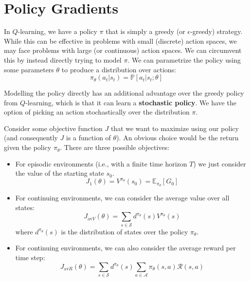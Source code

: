 \documentclass[journal, onecolumn, 12pt, draftclsnofoot]{IEEEtran}
\newcommand{\kword}[1]{\textbf{#1}}
\newcommand{\mc}[1]{\mathcal{#1}}
\begin{document}
		\newpage
		\section{Policy Gradients}
		\label{sec:policy-gradients}
		\par In $Q$-learning, we have a policy $\pi$ that is simply a greedy (or $\epsilon$-greedy) strategy. While this can be effective in problems with small (discrete) action spaces, we may face problems with large (or continuous) action spaces. We can circumvent this by instead directly trying to model $\pi$. We can parametrize the policy using some parameters $\theta$ to produce a distribution over actions:
		\begin{equation}
			\label{eqn:policy-as-distribution}
			\pi_\theta(a_t \big\vert s_t) = \mathbb{P}\left[ a_t \big\vert s_t; \theta \right]
		\end{equation}
		\par Modelling the policy directly has an additional advantage over the greedy policy from $Q$-learning, which is that it can learn a \kword{stochastic policy}. We have the option of picking an action stochastically over the distribution $\pi$.
		\par Consider some objective function $J$ that we want to maximize using our policy (and consequently $J$ is a function of $\theta$). An obvious choice would be the return given the policy $\pi_\theta$. There are three possible objectives:
		\begin{itemize}
			\item For episodic environments (i.e., with a finite time horizon $T$) we just consider the value of the starting state $s_0$.
			\begin{equation}
				\label{eqn:j-1-episodic}
				J_1(\theta) = V^{\pi_\theta}(s_0) = \mathbb{E}_{\pi_\theta} \left[ G_0 \right]
			\end{equation}

			\item For continuing environments, we can consider the average value over all states:
			\begin{equation}
				\label{eqn:j-1-average-value}
				J_{\text{av}V}(\theta) = \sum_{s \in \mc{S}} d^{\pi_\theta}(s) V^{\pi_\theta}(s)
			\end{equation}
			where $d^{\pi_\theta}(s)$ is the distribution of states over the policy $\pi_\theta$.
			\item For continuing environments, we can also consider the average reward per time step:
			\begin{equation}
				\label{eqn:j-1-average-reward}
				J_{\text{av}R}(\theta) = \sum_{s \in \mc{S}} d^{\pi_\theta}(s) \sum_{a \in \mc{A}} \pi_\theta (s, a) \mc{R}(s,a)
			\end{equation}
		\end{itemize}
\end{document}
